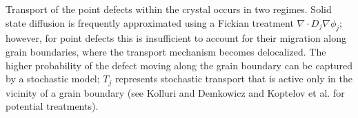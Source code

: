 \documentclass[11pt]{article}
\newcommand{\MarginPar}[1]{\marginpar{%
\vskip-\baselineskip %
\raggedright\tiny\sffamily
\hrule\smallskip{\color{red}#1}\par\smallskip\hrule}}
\begin{document}
Transport of the point defects within the crystal occurs in two
regimes. Solid state diffusion is frequently approximated using a
Fickian treatment $\nabla\cdot D_j \nabla \phi_j$;
however, for point defects this is insufficient to account for their
migration along grain boundaries, where the
transport mechanism becomes delocalized. The higher
probability of the defect moving along the grain boundary can be
captured by a stochastic model; $T_j$ represents stochastic transport
that is active only in the vicinity of a grain boundary (see  Kolluri and
Demkowicz \cite{Kolluri12} and Koptelov et al. \cite{Koptelov84} for  potential treatments). 
\end{document}
